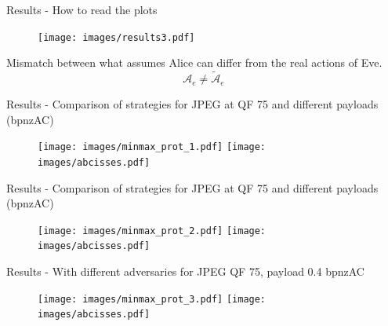 \documentclass[10pt]{beamer}
\begin{document}







\begin{frame}{Results - How to read the plots }
    \begin{figure}
        \texttt{[image: images/results3.pdf]}
    \end{figure}

    \pause

    Mismatch between what assumes Alice can differ from the real actions of Eve. 
    $$ \mathcal{A}_e \neq \tilde{\mathcal{A}}_e $$

\end{frame}


\begin{frame}{Results - Comparison of strategies for JPEG at QF 75 and different payloads (bpnzAC)}
    \begin{figure}
        \texttt{[image: images/minmax\_prot\_1.pdf]}
        \texttt{[image: images/abcisses.pdf]}
    \end{figure}
\end{frame}

\begin{frame}{Results - Comparison of strategies for JPEG at QF 75 and different payloads (bpnzAC)}
    \begin{figure}
        \texttt{[image: images/minmax\_prot\_2.pdf]}
        \texttt{[image: images/abcisses.pdf]}
    \end{figure}
\end{frame}

\begin{frame}{Results - With different adversaries for JPEG QF 75, payload 0.4 bpnzAC}
    \begin{figure}
        \texttt{[image: images/minmax\_prot\_3.pdf]}
        \texttt{[image: images/abcisses.pdf]}
    \end{figure}
\end{frame}
\end{document}

